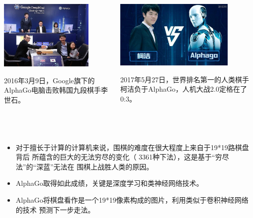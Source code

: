 \begin{frame}[fragile]
  \frametitle{~}

  \begin{columns}
    \begin{column}[T]{.5\linewidth}
      \includegraphics[width=0.8\textwidth]{figs/intro/alphago_1.png}

      2016年3月9日，Google旗下的AlphaGo电脑击败韩国九段棋手李世石。
    \end{column}
    \begin{column}[T]{.5\linewidth}
      \includegraphics[width=0.8\textwidth]{figs/intro/alphago_2.png}

      2017年5月27日，世界排名第一的人类棋手柯洁负于AlphaGo，人机大战2.0定格在了0:3。
    \end{column}
  \end{columns}
\end{frame}

\begin{frame}[fragile]
  \frametitle{~}

  \begin{itemize}
  \item 对于擅长于计算的计算机来说，围棋的难度在很大程度上来自于19*19路棋盘背后
    所蕴含的巨大的无法穷尽的变化（ 3361种下法），这是基于“穷尽法”的“深蓝”无法在
    围棋上战胜人类的原因。

  \item AlphaGo取得如此成绩，关键是深度学习和类神经网络技术。
  \item AlphaGo将棋盘看作是一个19*19像素构成的图片，利用类似于卷积神经网络的技术
    预测下一步走法。
  \end{itemize}
\end{frame}


